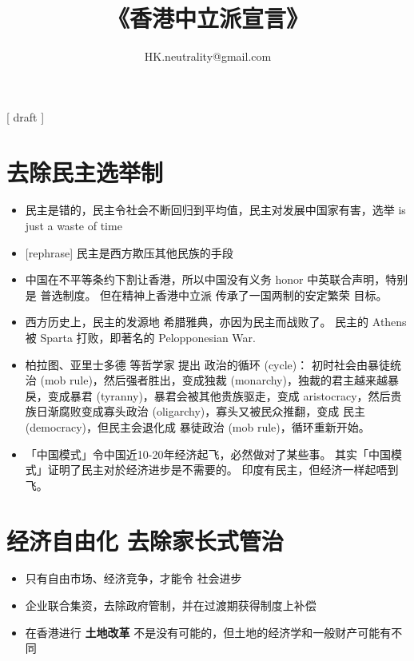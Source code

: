 

\usepackage[backend=biber]{biblatex}


\usepackage[CJKspace]{xeCJK}

\title{《香港中立派宣言》}
\author{HK.neutrality@gmail.com}

\setcounter{secnumdepth}{0}		%


\maketitle

{\color{red}[ draft ]}

\section{去除民主选举制}

\begin{itemize}
	\item 民主是错的，民主令社会不断回归到平均值，民主对发展中国家有害，选举 is just a waste of time
	\item {\color{red}[rephrase]} 民主是西方欺压其他民族的手段
	\item 中国在不平等条约下割让香港，所以中国没有义务 honor 中英联合声明，特别是 普选制度。 但在精神上香港中立派 传承了一国两制的安定繁荣 目标。
	\item 西方历史上，民主的发源地 希腊雅典，亦因为民主而战败了。 民主的 Athens 被 Sparta 打败，即著名的 Pelopponesian War.
	\item 柏拉图、亚里士多德 等哲学家 提出 政治的循环 (cycle)： 初时社会由暴徒统治 (mob rule)，然后强者胜出，变成独裁 (monarchy)，独裁的君主越来越暴戾，变成暴君 (tyranny)，暴君会被其他贵族驱走，变成 aristocracy，然后贵族日渐腐败变成寡头政治 (oligarchy)，寡头又被民众推翻，变成 民主 (democracy)，但民主会退化成 暴徒政治 (mob rule)，循环重新开始。 
	\item 「中国模式」令中国近10-20年经济起飞，必然做对了某些事。 其实「中国模式」证明了民主对於经济进步是不需要的。 印度有民主，但经济一样起唔到飞。
\end{itemize}

\section{经济自由化 \textbullet 去除家长式管治}

\begin{itemize}
	\item 只有自由市场、经济竞争，才能令 社会进步
	\item 企业联合集资，去除政府管制，并在过渡期获得制度上补偿
	\item 在香港进行 \textbf{土地改革} 不是没有可能的，但土地的经济学和一般财产可能有不同 \cite{Ryan-Collins2017} \cite{Farvacque-Vitkoviac1992} \cite{Blomley2004} \cite{Linklater2013} \cite{Adams2015}
\end{itemize}

